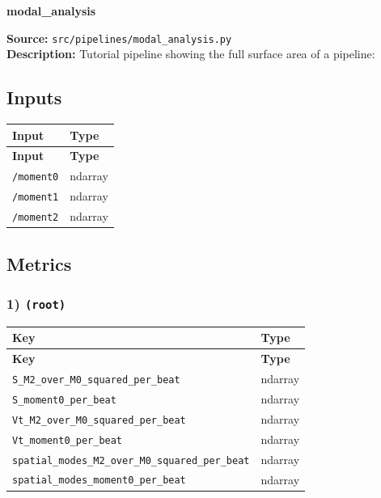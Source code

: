\documentclass[11pt]{article}
\begin{document}
\begin{center}
\LARGE\textbf{modal\_analysis}
\end{center}
\textbf{Source:} \texttt{src/\allowbreak{}pipelines/\allowbreak{}modal\_\allowbreak{}analysis.py}\\
\textbf{Description:} Tutorial pipeline showing the full surface area of a pipeline:

\subsection*{Inputs}
\begin{longtable}{|p{}|p{}|}
\hline
\textbf{Input} & \textbf{Type} \\ \hline
\endfirsthead
\hline
\textbf{Input} & \textbf{Type} \\ \hline
\endhead
\texttt{/\allowbreak{}moment0} & ndarray \\ \hline
\texttt{/\allowbreak{}moment1} & ndarray \\ \hline
\texttt{/\allowbreak{}moment2} & ndarray \\ \hline
\end{longtable}

\subsection*{Metrics}
\subsubsection*{1) \texttt{(root)}}
\begin{longtable}{|p{}|p{}|}
\hline
\textbf{Key} & \textbf{Type} \\ \hline
\endfirsthead
\hline
\textbf{Key} & \textbf{Type} \\ \hline
\endhead
\texttt{S\_\allowbreak{}M2\_\allowbreak{}over\_\allowbreak{}M0\_\allowbreak{}squared\_\allowbreak{}per\_\allowbreak{}beat} & ndarray \\ \hline
\texttt{S\_\allowbreak{}moment0\_\allowbreak{}per\_\allowbreak{}beat} & ndarray \\ \hline
\texttt{Vt\_\allowbreak{}M2\_\allowbreak{}over\_\allowbreak{}M0\_\allowbreak{}squared\_\allowbreak{}per\_\allowbreak{}beat} & ndarray \\ \hline
\texttt{Vt\_\allowbreak{}moment0\_\allowbreak{}per\_\allowbreak{}beat} & ndarray \\ \hline
\texttt{spatial\_\allowbreak{}modes\_\allowbreak{}M2\_\allowbreak{}over\_\allowbreak{}M0\_\allowbreak{}squared\_\allowbreak{}per\_\allowbreak{}beat} & ndarray \\ \hline
\texttt{spatial\_\allowbreak{}modes\_\allowbreak{}moment0\_\allowbreak{}per\_\allowbreak{}beat} & ndarray \\ \hline
\end{longtable}
\end{document}
